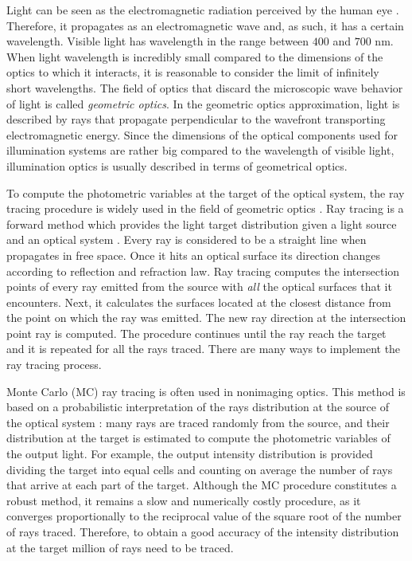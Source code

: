 Light can be seen as the electromagnetic radiation perceived by the human eye \cite{schreuder2008outdoor}. Therefore, it propagates as an electromagnetic wave and, as such, it has a certain wavelength. Visible light has wavelength in the range between $400$ and $700$ nm. When light wavelength is incredibly small compared to the dimensions of the optics to which it interacts, it is reasonable to consider the limit of infinitely short wavelengths. The field of optics that discard the microscopic wave behavior of light is called \textit{geometric optics}. In the geometric optics approximation, light is described by rays that propagate perpendicular to the wavefront transporting electromagnetic energy. Since the dimensions of the optical components used for illumination systems are rather big compared to the wavelength of visible light, illumination optics is usually described in terms of geometrical optics. 

To compute the photometric variables at the target of the
optical system, the ray tracing procedure is widely used in the field of geometric optics \cite{glassner1989introduction}.
Ray tracing is a forward method which provides the light target distribution given a light source and an optical system \cite{Gross2005Handbook}. Every ray is considered to be a straight line when propagates in free space. Once it hits an optical surface its direction changes according to reflection and refraction law. Ray tracing computes the intersection points of every ray emitted from the source with \textit{all} the optical surfaces that it encounters. Next, it calculates the surfaces located at the closest distance from the point on which the ray was emitted. The new ray direction at the intersection point ray is computed. The procedure continues until the ray reach the target and it is repeated for all the rays traced.
There are many ways to implement the ray tracing process.

Monte Carlo (MC) ray tracing is often used in nonimaging
optics. This method is based on a probabilistic interpretation
of the rays distribution at the source of the optical
system \cite{liu2010precise,Ting:1}: many rays are traced randomly from the source,
and their distribution at the target is estimated to compute the
photometric variables of the output light. For example, the output intensity distribution is provided dividing the target into equal cells and counting on average the number of rays that arrive at each part of the target. Although the MC
procedure constitutes a robust method, it remains a slow and
numerically costly procedure, as it converges proportionally
to the reciprocal value of the square root of the number of rays
traced. Therefore, to obtain a good accuracy of the intensity distribution at the target million of rays need to be traced.

